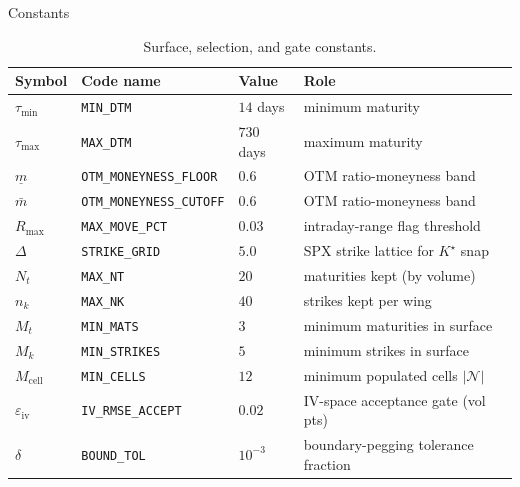 \documentclass[a4paper, 11pt, reqno]{amsart}
\makeatletter
\def\section{\@startsection{section}{1}%
  \z@{.7\linespacing\@plus\linespacing}{.5\linespacing}%
  {\normalfont\bfseries\centering}}
\makeatother
\begin{document}
	\section{Constants}\label{sec:constants}
		\begin{table}[H]
		\centering
		\small
		\begin{tabular}{llll}
			\toprule
			Symbol & Code name & Value & Role \\
			\midrule
			$\tau_{\min}$        & \texttt{MIN\_DTM}        & $14$ days    & minimum maturity \\
			$\tau_{\max}$        & \texttt{MAX\_DTM}        & $730$ days   & maximum maturity \\
			$\underline{m}$ & \texttt{OTM\_MONEYNESS\_FLOOR} & $0.6$ & OTM ratio-moneyness band \\
			$\bar m$ & \texttt{OTM\_MONEYNESS\_CUTOFF} & $0.6$ & OTM ratio-moneyness band \\
			$R_{\max}$           & \texttt{MAX\_MOVE\_PCT}  & $0.03$       & intraday-range flag threshold \\
			$\Delta$             & \texttt{STRIKE\_GRID}    & $5.0$        & SPX strike lattice for $K^\star$ snap \\
			$N_t$                & \texttt{MAX\_NT}         & $20$         & maturities kept (by volume) \\
			$n_k$                & \texttt{MAX\_NK}         & $40$         & strikes kept per wing \\
			$M_t$                & \texttt{MIN\_MATS}       & $3$          & minimum maturities in surface \\
			$M_k$                & \texttt{MIN\_STRIKES}    & $5$          & minimum strikes in surface \\
			$M_{\mathrm{cell}}$  & \texttt{MIN\_CELLS}      & $12$         & minimum populated cells $|\mathcal{N}|$ \\
			$\varepsilon_{\mathrm{iv}}$ & \texttt{IV\_RMSE\_ACCEPT} & $0.02$ & IV-space acceptance gate (vol pts) \\
			$\delta$             & \texttt{BOUND\_TOL}      & $10^{-3}$    & boundary-pegging tolerance fraction \\
			\bottomrule
		\end{tabular}
		\vspace*{-0.8em}
		\caption{Surface, selection, and gate constants.}\label{tab:const}
		\end{table}
		\vspace{-0.8em}
\end{document}
